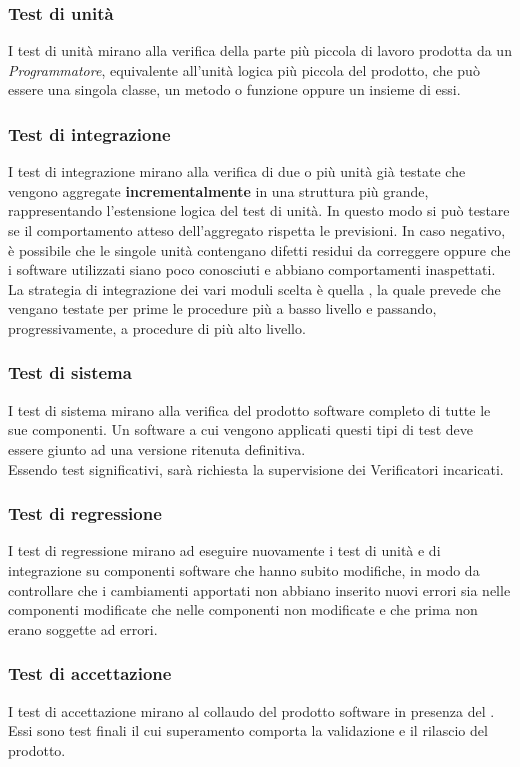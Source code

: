 \subsubsection{Test di unità}
I test di unità mirano alla verifica della parte più piccola di lavoro prodotta da un \emph{Programmatore}, equivalente all'unità logica più piccola del prodotto, che può essere una singola classe, un metodo o funzione oppure un insieme di essi.
\subsubsection{Test di integrazione}
I test di integrazione mirano alla verifica di due o più unità già testate che vengono aggregate \textbf{incrementalmente} in una struttura più grande, rappresentando l’estensione logica del test di unità. In questo modo si può testare se il comportamento atteso dell'aggregato rispetta le previsioni. In caso negativo, è possibile che le singole unità contengano difetti residui da correggere oppure che i software utilizzati siano poco conosciuti e abbiano comportamenti inaspettati.\\
La strategia di integrazione dei vari moduli scelta è quella , la quale prevede che vengano testate per prime le procedure più a basso livello e passando, progressivamente, a procedure di più alto livello. 
\subsubsection{Test di sistema}
I test di sistema mirano alla verifica del prodotto software completo di tutte le sue componenti. Un software a cui vengono applicati questi tipi di test deve essere giunto ad una versione ritenuta definitiva. \\
Essendo test significativi, sarà richiesta la supervisione dei Verificatori incaricati.
\subsubsection{Test di regressione}
I test di regressione mirano ad eseguire nuovamente i test di unità e di integrazione su componenti software che hanno subito modifiche, in modo da controllare che i cambiamenti apportati non abbiano inserito nuovi errori sia nelle componenti modificate che nelle componenti non modificate e che prima non erano soggette ad errori.
\subsubsection{Test di accettazione}
I test di accettazione mirano al collaudo del prodotto software in presenza del . Essi sono test finali il cui superamento comporta la validazione e il rilascio del prodotto.

